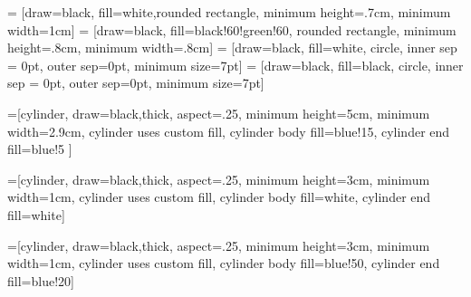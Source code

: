 \documentclass{article}
\begin{document}
\pagestyle{empty}

\begin{comment}
:Title: Incomplete Erasure Channel
\end{comment}

 = [draw=black, fill=white,rounded rectangle, minimum height=.7cm, minimum width=1cm]
 = [draw=black, fill=black!60!green!60, rounded rectangle, minimum height=.8cm, minimum width=.8cm]
 = [draw=black, fill=white, circle, inner sep = 0pt, outer sep=0pt, minimum size=7pt]
 = [draw=black, fill=black, circle, inner sep = 0pt, outer sep=0pt, minimum size=7pt]

=[cylinder, draw=black,thick, aspect=.25, minimum height=5cm,
                      minimum width=2.9cm, cylinder uses custom fill, 
                      cylinder body fill=blue!15, cylinder end fill=blue!5 ]

=[cylinder, draw=black,thick, aspect=.25, minimum height=3cm,
                      minimum width=1cm, cylinder uses custom fill, 
                      cylinder body fill=white, cylinder end fill=white]

=[cylinder, draw=black,thick, aspect=.25, minimum height=3cm,
                      minimum width=1cm, cylinder uses custom fill, 
                      cylinder body fill=blue!50, cylinder end fill=blue!20]

\newcommand\drawArc[1]{
\draw[dashed]
let \p1 = ($ (#1.after bottom) - (#1.before bottom) $),
\n1 = {0.5*veclen(\x1,\y1)-\pgflinewidth},
\p2 = ($ (#1.bottom) - (#1.after bottom)!.5!(#1.before bottom) $),
\n2 = {veclen(\x2,\y2)-\pgflinewidth}
in
([xshift=-\pgflinewidth] #1.before bottom) arc [start angle=270, delta angle=180,
x radius=\n2, y radius=\n1]
}

\newcommand\drawArcL[1]{
\draw[dashed]
let \p1 = ($ (#1.after bottom) - (#1.before bottom) $),
\n1 = {0.5*veclen(\x1,\y1)-\pgflinewidth},
\p2 = ($ (#1.bottom) - (#1.after bottom)!.5!(#1.before bottom) $),
\n2 = {veclen(\x2,\y2)-\pgflinewidth}
in
([xshift=-\pgflinewidth] #1.before bottom) arc [start angle=270, delta angle=180,
x radius= .1cm, y radius=\n1]
}
\end{document}
